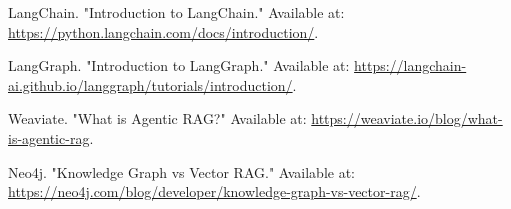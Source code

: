 \documentclass[12pt,a4paper,twoside,openright,justified]{book}
\begin{document}
\begin{thebibliography}{99}
LangChain. "Introduction to LangChain." 
Available at: \url{https://python.langchain.com/docs/introduction/}.

LangGraph. "Introduction to LangGraph." 
Available at: \url{https://langchain-ai.github.io/langgraph/tutorials/introduction/}.

Weaviate. "What is Agentic RAG?" 
Available at: \url{https://weaviate.io/blog/what-is-agentic-rag}.

Neo4j. "Knowledge Graph vs Vector RAG." 
Available at: \url{https://neo4j.com/blog/developer/knowledge-graph-vs-vector-rag/}.
\end{thebibliography}




\end{document}
